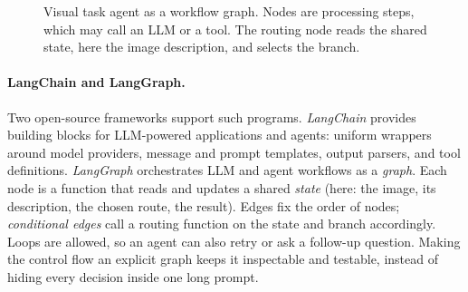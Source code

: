 \begin{figure}[ht]
  \centering
  \caption{Visual task agent as a workflow graph. Nodes are processing
  steps, which may call an LLM or a tool. The routing node reads the shared
  state, here the image description, and selects the branch.}
  \label{fig:vision-agent}
\end{figure}

\paragraph{LangChain and LangGraph.}
Two open-source frameworks support such programs. \emph{LangChain} provides
building blocks for LLM-powered applications and agents: uniform wrappers
around model providers, message and prompt templates, output parsers, and
tool definitions. \emph{LangGraph} orchestrates LLM and agent workflows as a
\emph{graph}. Each node is a function that reads and updates a shared
\emph{state} (here: the image, its description, the chosen route, the
result). Edges fix the order of nodes; \emph{conditional edges} call a
routing function on the state and branch accordingly. Loops are allowed, so
an agent can also retry or ask a follow-up question. Making the control flow
an explicit graph keeps it inspectable and testable, instead of hiding every
decision inside one long prompt.

